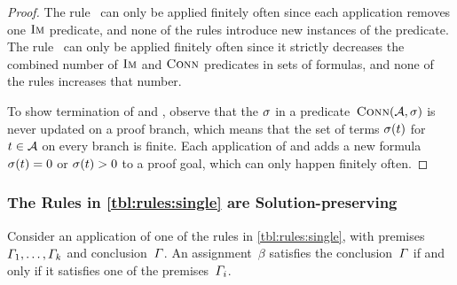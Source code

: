 \begin{proof}
  The rule~\Expand{} can only be applied finitely often since each
  application removes one $\operatorname{\textsc{Im}}$ predicate, and none of the rules
  introduce new instances of the predicate. The rule~\Subsume{} can
  only be applied finitely often since it strictly decreases the
  combined number of $\operatorname{\textsc{Im}}$ and $\operatorname{\textsc{Conn}}$ predicates in sets of
  formulas, and none of the rules increases that number.

  To show termination of \Split{} and \Propagate{}, observe that the
  $\operatorname{\sigma}$ in a predicate~$\operatorname{\textsc{Conn}}(\mathcal{A}, \operatorname{\sigma})$ is never
  updated on a proof branch, which means that the set of terms
  $\operatorname{\sigma}(t)$ for $t \in \mathcal{A}$ on every branch is finite. Each
  application of \Split{} and \Propagate{} adds a new
  formula~$\operatorname{\sigma}(t) = 0$ or $\operatorname{\sigma}(t) > 0$
  to a proof goal, which can only happen finitely often.
\end{proof}

\subsubsection{The Rules in \cref{tbl:rules:single} are Solution-preserving}

\begin{lemma}\label{lma:single-correct}
  Consider an application of one of the rules in
  \cref{tbl:rules:single}, with
  premises~$\varGamma_1, \ldots, \varGamma_k$ and
  conclusion~$\varGamma$. An assignment~$\beta$ satisfies the
  conclusion~$\varGamma$ if and only if it satisfies one of the
  premises~$\varGamma_i$.
\end{lemma}

